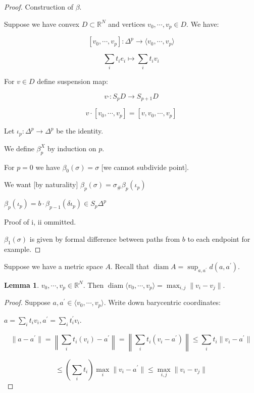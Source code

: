 \documentclass{article}
\theoremstyle{definition}
\newtheorem{lemma}[theorem]{Lemma}
\begin{document}
    \begin{proof}
        Construction of \(\beta\).

        Suppose we have convex \(D \subset \mathbb{R}^N\) and vertices \(v_0, \cdots , v_p \in D\). We have:

        \[
            [v_0, \cdots , v_p] : \Delta^p \to \langle v_0, \cdots , v_p \rangle
        \]

        \[
            \sum_{i} t_i e_i \mapsto \sum_{i} t_i v_i
        \]

        For \(v\in D\) define suspension map:

        \[
            v \cdot : S_p D \to S_{p+1} D
        \]

        \[
            v \cdot [v_0, \cdots , v_p] = [v, v_0, \cdots , v_p]
        \]

        Let \(\iota_p: \Delta^p \to \Delta^p\) be the identity.

        We define \(\beta_p^X\) by induction on \(p\).

        For \(p=0\) we have \(\beta_0(\sigma) = \sigma\) [we cannot subdivide point].

        We want [by naturality] \(\beta_p(\sigma) = \sigma_\# \beta_p(\iota_p)\)

        \(\beta_p(\iota_p) = b \cdot \beta_{p-1} (\delta \iota_p) \in S_p \Delta^p\)

        Proof of i, ii ommitted.

        \(\beta_1(\sigma)\) is given by formal difference between paths from \(b\) to each endpoint for example.

    \end{proof}

    Suppose we have a metric space \(A\). Recall that \(\operatorname{diam} A = \sup_{a,a^{\prime}} d(a,a^{\prime})\).

    \begin{lemma}
        \(v_0, \cdots , v_p \in \mathbb{R}^N\). Then \(\operatorname{diam} \langle v_0, \cdots , v_p \rangle = \max_{i,j} \lVert v_i - v_j \rVert\).
    \end{lemma}

    \begin{proof}
        Suppose \(a, a^{\prime}\in \langle v_0, \cdots , v_p \rangle\). Write down barycentric coordinates:

        \(a = \sum_{i} t_i v_i, a^{\prime} = \sum_{i} t_i^{\prime} v_i\).

        \[
            \lVert a - a^{\prime} \rVert = \left\lVert \sum_{i} t_i(v_i) - a^{\prime} \right\rVert = \left\lVert \sum_{i} t_i(v_i - a^{\prime}) \right\rVert \leq \sum_{i} t_{i} \lVert v_i - a^{\prime} \rVert
        \]
        
        \[
            \leq \left( \sum_{i} t_i \right) \max_i \lVert v_i - a^{\prime} \rVert \leq \max_{i,j} \lVert v_i - v_j \rVert 
        \]
    \end{proof}
\end{document}
